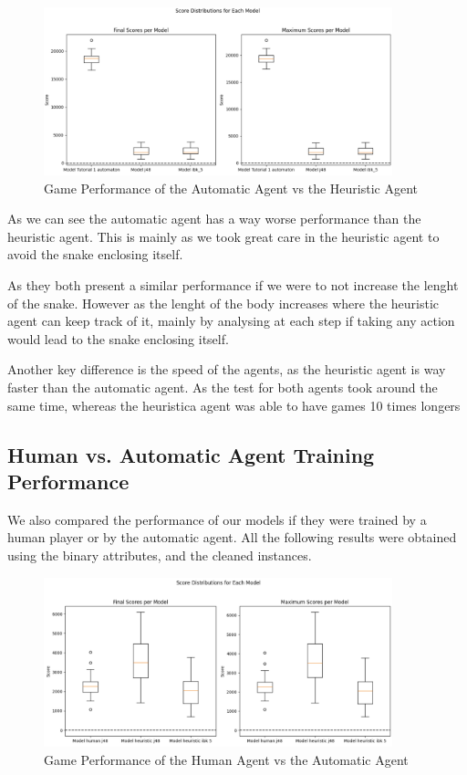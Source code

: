 \documentclass[12pt,a4paper]{article}
\begin{document}
\begin{figure}[ht]
    \centering
    \includegraphics[width=0.9\textwidth]{./images/heuristic.png} %
    \caption{Game Performance of the Automatic Agent vs the Heuristic Agent}
    \label{fig:game}
\end{figure}

As we can see the automatic agent has a way worse performance than the heuristic agent. 
This is mainly as we took great care in the heuristic agent to avoid the snake enclosing itself.

As they both present a similar performance if we were to not increase the lenght of the snake. 
However as the lenght of the body increases where the heuristic agent can keep track of it, 
mainly by analysing at each step if taking any action would lead to the snake enclosing itself.

Another key difference is the speed of the agents, as the heuristic agent is way faster than the automatic agent.
As the test for both agents took around the same time, whereas the heuristica agent was able to have games 10 times longers


\subsection{Human vs. Automatic Agent Training Performance}

We also compared the performance of our models if they were trained by a human player or by the automatic agent.
All the following results were obtained using the binary attributes, and the cleaned instances.

\begin{figure}[ht]
    \centering
    \includegraphics[width=0.9\textwidth]{./images/heuristic_training.png} %
    \caption{Game Performance of the Human Agent vs the Automatic Agent}
    \label{fig:game}
\end{figure}
\end{document}
